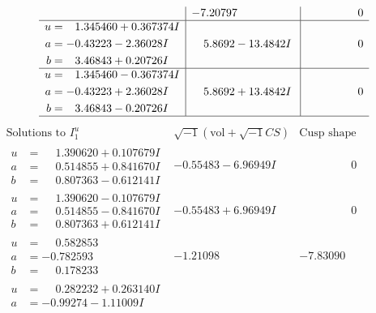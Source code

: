 \documentclass[1p]{elsarticle_modified}
\theoremstyle{definition}
\newcommand{\I}{\sqrt{-1}}
\begin{document}
$$\begin{array}{c|c|c}
 & -7.20797\phantom{ +0.000000I} & \phantom{-0.000000 } 0 \\ \hline\begin{aligned}
u &= \phantom{-}1.345460 + 0.367374 I \\
a &= -0.43223 - 2.36028 I \\
b &= \phantom{-}3.46843 + 0.20726 I\end{aligned}
 & \phantom{-}5.8692 - 13.4842 I & \phantom{-0.000000 } 0 \\ \hline\begin{aligned}
u &= \phantom{-}1.345460 - 0.367374 I \\
a &= -0.43223 + 2.36028 I \\
b &= \phantom{-}3.46843 - 0.20726 I\end{aligned}
 & \phantom{-}5.8692 + 13.4842 I & \phantom{-0.000000 } 0\\
 \hline 
 \end{array}$$\newpage$$\begin{array}{c|c|c}  
\text{Solutions to }I^u_{1}& \I (\text{vol} + \sqrt{-1}CS) & \text{Cusp shape}\\
 \hline 
\begin{aligned}
u &= \phantom{-}1.390620 + 0.107679 I \\
a &= \phantom{-}0.514855 + 0.841670 I \\
b &= \phantom{-}0.807363 - 0.612141 I\end{aligned}
 & -0.55483 - 6.96949 I & \phantom{-0.000000 } 0 \\ \hline\begin{aligned}
u &= \phantom{-}1.390620 - 0.107679 I \\
a &= \phantom{-}0.514855 - 0.841670 I \\
b &= \phantom{-}0.807363 + 0.612141 I\end{aligned}
 & -0.55483 + 6.96949 I & \phantom{-0.000000 } 0 \\ \hline\begin{aligned}
u &= \phantom{-}0.582853\phantom{ +0.000000I} \\
a &= -0.782593\phantom{ +0.000000I} \\
b &= \phantom{-}0.178233\phantom{ +0.000000I}\end{aligned}
 & -1.21098\phantom{ +0.000000I} & -7.83090\phantom{ +0.000000I} \\ \hline\begin{aligned}
u &= \phantom{-}0.282232 + 0.263140 I \\
a &= -0.99274 - 1.11009 I \\

\end{aligned}
\end{array}$$
\end{document}
